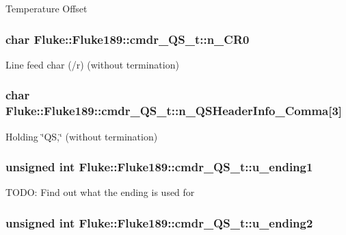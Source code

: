 \label{structFluke_1_1Fluke189_1_1cmdr__QS__t_a3ae4f44738b591f2dc068793861f2ea3}
Temperature Offset \hypertarget{structFluke_1_1Fluke189_1_1cmdr__QS__t_ac75ebbfd5c0fca3ed9debbf46fc71b61}{
\subsubsection[{n\_\-CR0}]{\setlength{\rightskip}{0pt plus 5cm}char {\bf Fluke::Fluke189::cmdr\_\-QS\_\-t::n\_\-CR0}}}
\label{structFluke_1_1Fluke189_1_1cmdr__QS__t_ac75ebbfd5c0fca3ed9debbf46fc71b61}
Line feed char (/r) (without termination) \hypertarget{structFluke_1_1Fluke189_1_1cmdr__QS__t_af2e192902c6c5598c38ebd1c33b3efd4}{
\subsubsection[{n\_\-QSHeaderInfo\_\-Comma}]{\setlength{\rightskip}{0pt plus 5cm}char {\bf Fluke::Fluke189::cmdr\_\-QS\_\-t::n\_\-QSHeaderInfo\_\-Comma}\mbox{[}3\mbox{]}}}
\label{structFluke_1_1Fluke189_1_1cmdr__QS__t_af2e192902c6c5598c38ebd1c33b3efd4}
Holding \char`\"{}QS,\char`\"{} (without termination) \hypertarget{structFluke_1_1Fluke189_1_1cmdr__QS__t_ae5e99fd781866c32cdba484e15276d7a}{
\subsubsection[{u\_\-ending1}]{\setlength{\rightskip}{0pt plus 5cm}unsigned int {\bf Fluke::Fluke189::cmdr\_\-QS\_\-t::u\_\-ending1}}}
\label{structFluke_1_1Fluke189_1_1cmdr__QS__t_ae5e99fd781866c32cdba484e15276d7a}
TODO: Find out what the ending is used for \hypertarget{structFluke_1_1Fluke189_1_1cmdr__QS__t_a08dec92163b6c7a734cdf4aa185d0875}{
\subsubsection[{u\_\-ending2}]{\setlength{\rightskip}{0pt plus 5cm}unsigned int {\bf Fluke::Fluke189::cmdr\_\-QS\_\-t::u\_\-ending2}}}
